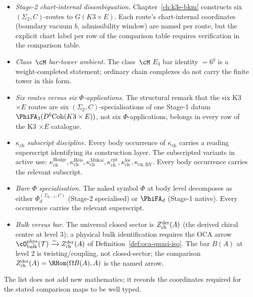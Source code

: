 \begin{itemize}[nosep]
\item \emph{Stage-2 chart-internal disambiguation.}
  Chapter~\ref{ch:k3e-bkm} constructs six $(\Sigma_2, C)$-routes
  to $G(K3 \times E)$. Each route's chart-internal coordinates
  (boundary vacuum $b$, admissibility window) are named per route, but
  the explicit chart label per row of the comparison table requires
	  verification in the comparison table.
\item \emph{Class~$\cM$ bar-tower ambient.} The class~$\cM$ $E_3$
  bar identity $=6^g$ is a weight-completed statement; ordinary chain
  complexes do not carry the finite tower in this form.
\item \emph{Six routes versus six $\Phi$-applications.} The structural
  remark that the six K3 $\times E$ routes are six
  $(\Sigma_2, C)$-specialisations of one Stage-1 datum
  $\PhiFA_3(D^b\mathrm{Coh}(K3 \times E))$, not six $\Phi$-applications,
	  belongs in every row of the K3 $\times E$ catalogue.
\item \emph{$\kappa_{\mathrm{ch}}$ subscript discipline.} Every
  body occurrence of $\kappa_{\mathrm{ch}}$ carries a reading
  superscript identifying its construction layer. The subscripted
  variants in active use:
  $\kappa_{\mathrm{ch}}^{\mathrm{Hodge}}, \kappa_{\mathrm{ch}}^{\mathrm{Heis}},
  \kappa_{\mathrm{ch}}^{\mathrm{Mukai}}, \kappa_{\mathrm{ch}}^{\mathrm{cpt}},
  \kappa_{\mathrm{ch}}^{\mathrm{loc}}, \kappa_{\mathrm{ch}, \mathrm{BV}}$.
  Every body occurrence carries the relevant subscript.
\item \emph{Bare $\Phi$ specialisation.} The naked symbol $\Phi$ at
  body level decomposes as either
  $\Phi^{(\Sigma_{d-1}, C)}_d$ (Stage-2 specialised) or $\PhiFA_d$
  (Stage-1 native). Every occurrence carries the relevant superscript.
\item \emph{Bulk versus bar.} The universal closed sector is
  $Z^{\mathrm{der}}_{\mathrm{ch}}(A)$ (the derived chiral centre at level $3$); a physical
  bulk identification requires the OCA arrow
  $\cO^{\mathrm{phys}}_{\mathrm{bulk}}(\mathcal T) \xrightarrow{\sim} \Zder(A)$
  of Definition~\ref{def:oca-quasi-iso}. The bar $B(A)$ at level $2$
  is twisting/coupling, not closed-sector; the comparison
  $\Zder(A) = \RHom(\Omega B(A), A)$ is the named arrow.
\end{itemize}

The list does not add new mathematics; it records the coordinates required
for the stated comparison maps to be well typed.
